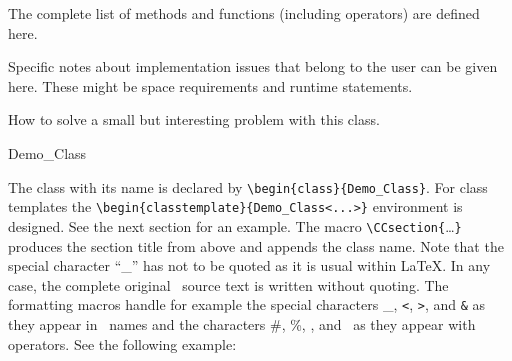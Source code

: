 \documentclass[12pt]{article}
\begin{document}
\CCoperations The complete list of methods and functions (including
operators) are defined here.

\CCimplementation Specific notes about implementation issues that belong
to the user can be given here. These might be space requirements and
runtime statements.

\CCexample How to solve a small but interesting problem with this class.


\begin{CCclass}{Demo_Class}

The class with its name is declared by 
\verb"\b"\verb"egin{class}{Demo_Class}". 
For class templates the \verb"\b"\verb"egin{classtemplate}{Demo_Class<...>}"
environment is  designed. See the next section for an example.
The macro \verb"\"\verb"CCsection{"\ldots\verb"}" produces the section
title from above and appends the class name. Note that the special
character ``\_'' has not to be quoted as it is usual within \LaTeX.
In any case, the complete original \CC\ source text is written
without quoting. The formatting macros handle for example the special
characters \_, {\tt <}, {\tt >}, and {\tt \&} as they appear in \CC\
names and the characters \#, \%, \CChat, and \CCtilde\ as they appear
with operators. See the following example: 
\CCstyle{
    #define %

This example is created using the {\verb+\CC+}{\tt style} macro
that formats its single parameter in this style.

To achieve this behavior with \TeX\, the \verb"\catcode" values of
some characters has to be changed. So within the \CC\ code 
things like comments with ``\%'' sign will not work. Several macros read a
second parameter with a \TeX\ comment to the declaration. The catcodes
are restored just before this second parameter. A sad sideeffect is
that these changed catcodes will not apply if these macros are invoked
within other macros. In that case, the argument text was just once
parsed from \TeX\ and the catcodes are all fixed before the catcode
changing macro expands.

\CCdefinition 

The class \CCclassName\ does nothing. The formatted name of the class
can be accessed using the macro \verb"\"\verb"classname". The unformatted
name as it was originally written can be accessed using the
\verb"\"\verb"pureclassname" macro.

}
\end{CCclass}
\end{document}
